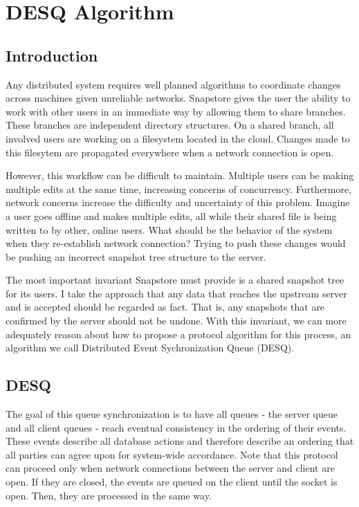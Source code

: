 \chapter{DESQ Algorithm}

\section{Introduction}

Any distributed system requires well planned algorithms to coordinate changes across machines given unreliable networks. Snapstore gives the user the ability to work with other users in an immediate way by allowing them to share branches. These branches are independent directory structures. On a shared branch, all involved users are working on a filesystem located in the cloud. Changes made to this filesytem are propagated everywhere when a network connection is open.

However, this workflow can be difficult to maintain. Multiple users can be making multiple edits at the same time, increasing concerns of concurrency.  Furthermore, network concerns increase the difficulty and uncertainty of this problem. Imagine a user goes offline and makes multiple edits, all while their shared file is being written to by other, online users. What should be the behavior of the system when they re-establish network connection? Trying to push these changes would be pushing an incorrect snapshot tree structure to the server. 

The most important invariant Snapstore must provide is a shared snapshot tree for its users. I take the approach that any data that reaches the upstream server and is accepted should be regarded as fact. That is, any snapshots that are confirmed by the server should not be undone. With this invariant, we can more adequately reason about how to propose a protocol algorithm for this process, an algorithm we call Distributed Event Sychronization Queue (DESQ).

\section{DESQ}

The goal of this queue synchronization is to have all queues - the server queue and all client queues - reach eventual consistency in the ordering of their events. These events describe all database actions and therefore describe an ordering that all parties can agree upon for system-wide accordance. Note that this protocol can proceed only when network connections between the server and client are open. If they are closed, the events are queued on the client until the socket is open. Then, they are processed in the same way.

